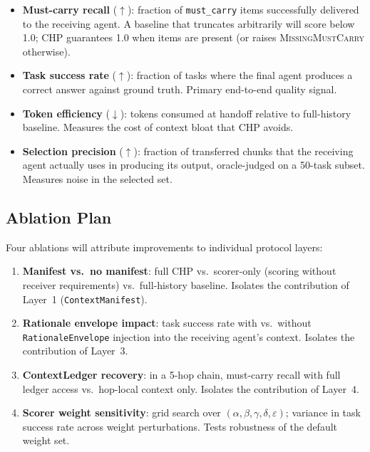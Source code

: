 \documentclass[11pt]{article}
\begin{document}
\begin{itemize}
  \item \textbf{Must-carry recall} ($\uparrow$): fraction of
    \texttt{must\_carry} items successfully delivered to the receiving
    agent. A baseline that truncates arbitrarily will score below 1.0;
    CHP guarantees 1.0 when items are present (or raises
    \textsc{MissingMustCarry} otherwise).

  \item \textbf{Task success rate} ($\uparrow$): fraction of tasks where
    the final agent produces a correct answer against ground truth.
    Primary end-to-end quality signal.

  \item \textbf{Token efficiency} ($\downarrow$): tokens consumed at
    handoff relative to full-history baseline. Measures the cost of
    context bloat that CHP avoids.

  \item \textbf{Selection precision} ($\uparrow$): fraction of transferred
    chunks that the receiving agent actually uses in producing its output,
    oracle-judged on a 50-task subset. Measures noise in the selected set.
\end{itemize}

\subsection{Ablation Plan}

Four ablations will attribute improvements to individual protocol layers:

\begin{enumerate}[label=\textbf{A\arabic*.}]
  \item \textbf{Manifest vs.\ no manifest}: full CHP vs.\ scorer-only
    (scoring without receiver requirements) vs.\ full-history baseline.
    Isolates the contribution of Layer~1 (\texttt{ContextManifest}).

  \item \textbf{Rationale envelope impact}: task success rate with
    vs.\ without \texttt{RationaleEnvelope} injection into the receiving
    agent's context. Isolates the contribution of Layer~3.

  \item \textbf{ContextLedger recovery}: in a 5-hop chain, must-carry
    recall with full ledger access vs.\ hop-local context only. Isolates
    the contribution of Layer~4.

  \item \textbf{Scorer weight sensitivity}: grid search over
    $(\alpha, \beta, \gamma, \delta, \varepsilon)$; variance in task
    success rate across weight perturbations. Tests robustness of
    the default weight set.
\end{enumerate}
\end{document}
